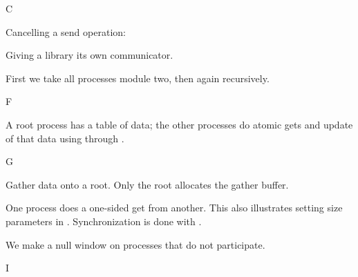 
 {C}


Cancelling a send operation:





Giving a library its own communicator.



First we take all processes module two, then
again recursively.


 {F}


A root process has a table of data; the other processes do 
atomic gets and update of that data using  through .
%
%

 {G}


Gather data onto a root. Only the root allocates the gather buffer.


One process does a one-sided get from another. This also illustrates
setting size parameters in
. Synchronization is done with
.
%

We make a null window on processes that do not participate.
%

 {I}

